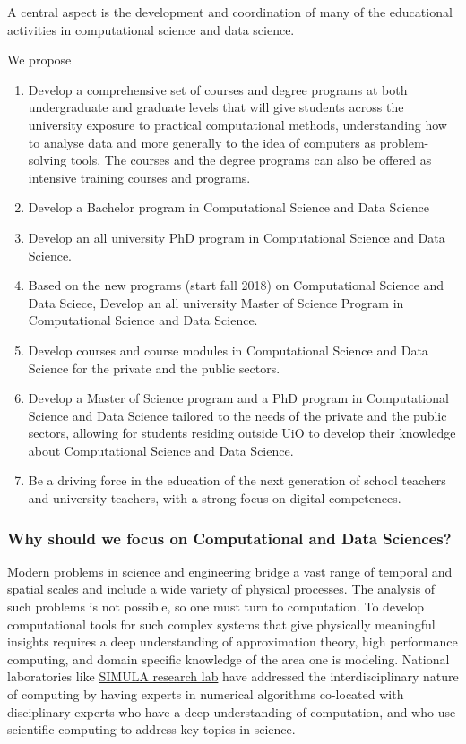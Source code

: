 \documentclass[]{article}
\providecommand{\tightlist}{%
  \setlength{\itemsep}{0pt}\setlength{\parskip}{0pt}}
\begin{document}
A central aspect is the development and coordination of many of the
educational activities in computational science and data science.

We propose

\begin{enumerate}
\def\labelenumi{\arabic{enumi}.}
\tightlist
\item
  Develop a comprehensive set of courses and degree programs at both
  undergraduate and graduate levels that will give students across the
  university exposure to practical computational methods, understanding
  how to analyse data and more generally to the idea of computers as
  problem-solving tools. The courses and the degree programs can also be
  offered as intensive training courses and programs.\\
\item
  Develop a Bachelor program in Computational Science and Data Science
\item
  Develop an all university PhD program in Computational Science and
  Data Science.
\item
  Based on the new programs (start fall 2018) on Computational Science
  and Data Sciece, Develop an all university Master of Science Program
  in Computational Science and Data Science.
\item
  Develop courses and course modules in Computational Science and Data
  Science for the private and the public sectors.
\item
  Develop a Master of Science program and a PhD program in Computational
  Science and Data Science tailored to the needs of the private and the
  public sectors, allowing for students residing outside UiO to develop
  their knowledge about Computational Science and Data Science.
\item
  Be a driving force in the education of the next generation of school
  teachers and university teachers, with a strong focus on digital
  competences.
\end{enumerate}

\hypertarget{why-should-we-focus-on-computational-and-data-sciences}{%
\subsubsection{Why should we focus on Computational and Data
Sciences?}\label{why-should-we-focus-on-computational-and-data-sciences}}

Modern problems in science and engineering bridge a vast range of
temporal and spatial scales and include a wide variety of physical
processes. The analysis of such problems is not possible, so one must
turn to computation. To develop computational tools for such complex
systems that give physically meaningful insights requires a deep
understanding of approximation theory, high performance computing, and
domain specific knowledge of the area one is modeling. National
laboratories like \href{https://www.simula.no/}{SIMULA research lab}
have addressed the interdisciplinary nature of computing by having
experts in numerical algorithms co-located with disciplinary experts who
have a deep understanding of computation, and who use scientific
computing to address key topics in science.
\end{document}
